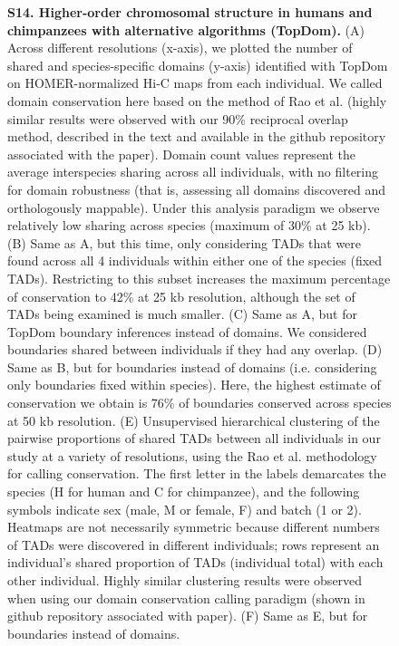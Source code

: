 \begin{figure}[!htb]
\caption[Higher-order chromosomal structure in humans and chimpanzees with alternative algorithms (TopDom).]{\textbf{S14. Higher-order chromosomal structure in humans and chimpanzees with alternative algorithms (TopDom).} (A) Across different resolutions (x-axis), we plotted the number of shared and species-specific domains (y-axis) identified with TopDom \cite{Shin.2016} on HOMER-normalized Hi-C maps from each individual. We called domain conservation here based on the method of Rao et al. \cite{Rao.2014} (highly similar results were observed with our 90\% reciprocal overlap method, described in the text and available in the github repository associated with the paper). Domain count values represent the average interspecies sharing across all individuals, with no filtering for domain robustness (that is, assessing all domains discovered and orthologously mappable). Under this analysis paradigm we observe relatively low sharing across species (maximum of 30\% at 25 kb). (B) Same as A, but this time, only considering TADs that were found across all 4 individuals within either one of the species (fixed TADs). Restricting to this subset increases the maximum percentage of conservation to 42\% at 25 kb resolution, although the set of TADs being examined is much smaller. (C) Same as A, but for TopDom \cite{Shin.2016} boundary inferences instead of domains. We considered boundaries shared between individuals if they had any overlap. (D) Same as B, but for boundaries instead of domains (i.e. considering only boundaries fixed within species). Here, the highest estimate of conservation we obtain is 76\% of boundaries conserved across species at 50 kb resolution. (E) Unsupervised hierarchical clustering of the pairwise proportions of shared TADs between all individuals in our study at a variety of resolutions, using the Rao et al. \cite{Rao.2014} methodology for calling conservation. The first letter in the labels demarcates the species (H for human and C for chimpanzee), and the following symbols indicate sex (male, M or female, F) and batch (1 or 2). Heatmaps are not necessarily symmetric because different numbers of TADs were discovered in different individuals; rows represent an individual's shared proportion of TADs (individual total) with each other individual. Highly similar clustering results were observed when using our domain conservation calling paradigm (shown in github repository associated with paper). (F) Same as E, but for boundaries instead of domains.}
\label{fig:ch02-figS14}
\end{figure}


